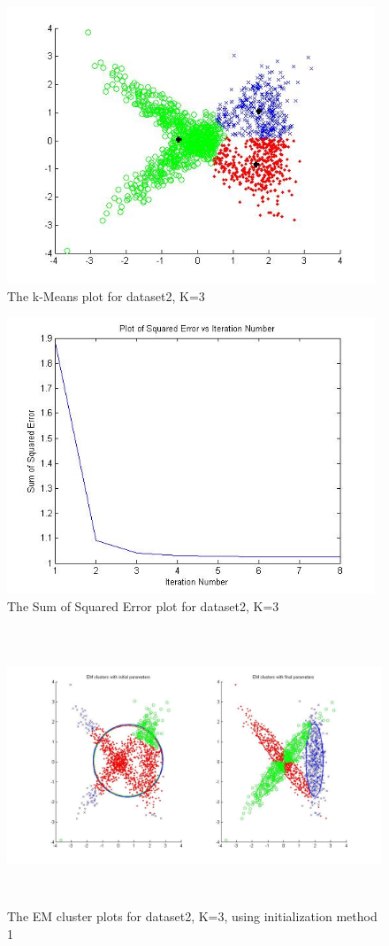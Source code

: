 \documentclass[11pt,psfig]{article}
\begin{document}
\begin{figure}[H]
\centering
\includegraphics[height=3.25in]{dataset2_kMeansPlot.jpg}
\caption{The k-Means plot for dataset2, K=3}
\end{figure}

\begin{figure}[H]
\centering
\includegraphics[height=3.25in]{dataset2_kMeans_squaredErrorPlot.jpg}
\caption{The Sum of Squared Error plot for dataset2, K=3}
\end{figure}

\begin{figure}[H]
\centering
\includegraphics[height=3.25in]{dataset2_EMclusterPlots.jpg}
\caption{The EM cluster plots for dataset2, K=3, using initialization method 1}
\end{figure}
\end{document}
